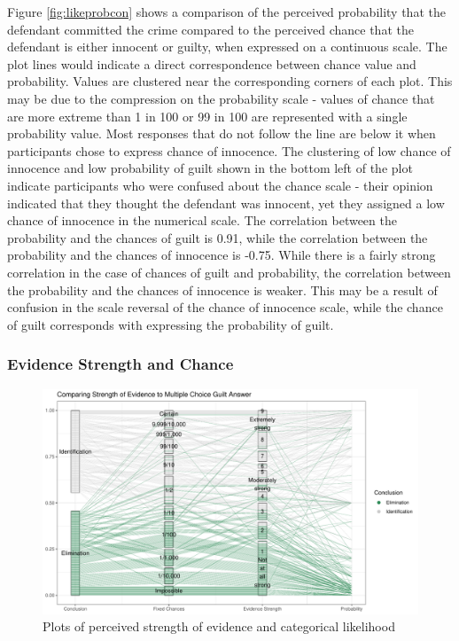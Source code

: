 \documentclass[print]{nuthesis}
\begin{document}
Figure \ref{fig:likeprobcon} shows a comparison of the perceived probability that the defendant committed the crime compared to the perceived chance that the defendant is either innocent or guilty, when expressed on a continuous scale.
The plot lines would indicate a direct correspondence between chance value and probability.
Values are clustered near the corresponding corners of each plot.
This may be due to the compression on the probability scale - values of chance that are more extreme than 1 in 100 or 99 in 100 are represented with a single probability value.
Most responses that do not follow the line are below it when participants chose to express chance of innocence.
The clustering of low chance of innocence and low probability of guilt shown in the bottom left of the plot indicate participants who were confused about the chance scale - their opinion indicated that they thought the defendant was innocent, yet they assigned a low chance of innocence in the numerical scale.
The correlation between the probability and the chances of guilt is 0.91,
while the correlation between the probability and the chances of innocence is -0.75.
While there is a fairly strong correlation in the case of chances of guilt and probability, the correlation between the probability and the chances of innocence is weaker.
This may be a result of confusion in the scale reversal of the chance of innocence scale, while the chance of guilt  corresponds with expressing the probability of guilt.

\hypertarget{evidence-strength-and-chance}{%
\subsubsection{Evidence Strength and Chance}\label{evidence-strength-and-chance}}

\begin{figure}

{\centering \includegraphics[width=\linewidth]{thesis_files/figure-latex/coordstrcat-1} 

}

\caption{Plots of perceived strength of evidence and categorical likelihood}\label{fig:coordstrcat}
\end{figure}
\end{document}
